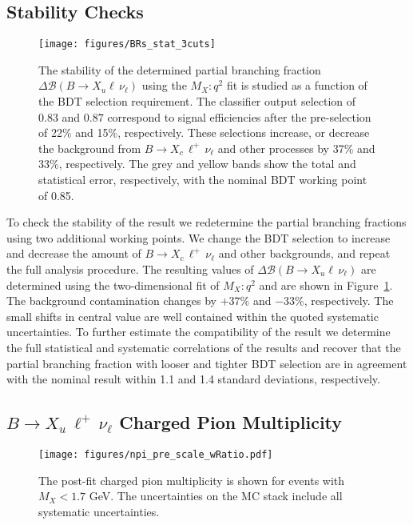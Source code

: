 \documentclass[twocolumn,aps,prd,superscriptaddress,nofootinbib,floatfix,preprintnumbers,a4]{revtex4-1}
\newcommand{\bulnu}{\ensuremath{B \to X_u \, \ell^+\, \nu_{\ell}}\xspace}
\newcommand{\bclnu}{\ensuremath{B \to X_c \, \ell^+\, \nu_{\ell}}\xspace}
\begin{document}
\subsection{Stability Checks}

\begin{figure}[b!]
 \texttt{[image: figures/BRs\_stat\_3cuts]} 
\caption{
   The stability of the determined partial branching fraction $\Delta \mathcal{B}(B \to X_u \ell \, \nu_\ell)$ using the $M_{X}:q^2$ fit is studied as a function of the BDT selection requirement. The classifier output selection of $0.83$ and $0.87$ correspond to signal efficiencies after the pre-selection of 22\% and 15\%, respectively. These selections increase, or decrease the background from \bclnu and other processes by 37\% and 33\%, respectively. The grey and yellow bands show the total and statistical error, respectively, with the nominal BDT working point of 0.85.
 }
\label{fig:stability}
\end{figure}

To check the stability of the result we redetermine the partial branching fractions using two additional working points. We change the BDT selection to increase and decrease the amount of \bclnu and other backgrounds, and repeat the full analysis procedure. The resulting values of $\Delta \mathcal{B}(B \to X_u \ell \, \nu_\ell)$ are determined using the two-dimensional fit of $M_X:q^2$ and are shown in Figure~\ref{fig:stability}. The background contamination changes by $+37\%$ and $-33\%$, respectively. The small shifts in central value are well contained within the quoted systematic uncertainties. To further estimate the compatibility of the result we determine the full statistical and systematic correlations of the results and recover that the partial branching fraction with looser and tighter BDT selection are in agreement with the nominal result within 1.1 and 1.4 standard deviations, respectively. 



\subsection{\bulnu Charged Pion Multiplicity}\label{subsec:pion_mult_res}

\begin{figure}[b!]
 \texttt{[image: figures/npi\_pre\_scale\_wRatio.pdf]} 
\caption{
  The post-fit charged pion multiplicity is shown for events with $M_{X} < 1.7$ GeV. The uncertainties on the MC stack include all systematic uncertainties. 
 }
\label{fig:np_chi_dist_post_fit}
\end{figure}
\end{document}
